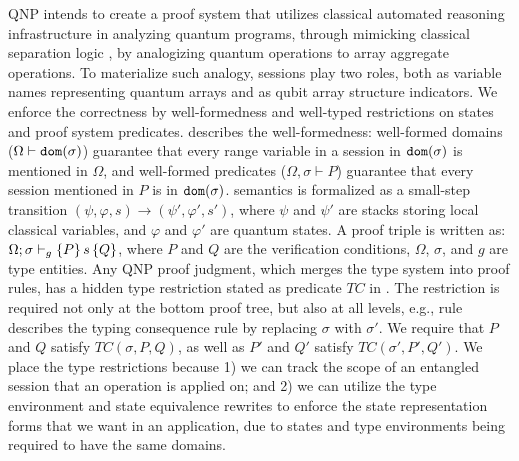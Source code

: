 QNP intends to create a proof system that utilizes classical automated reasoning infrastructure in analyzing quantum programs, through mimicking classical separation logic \cite{separationlogic}, by analogizing quantum operations to array aggregate operations.
To materialize such analogy, \qafny sessions play two roles, both as variable names representing quantum arrays and as qubit array structure indicators. We enforce the correctness by well-formedness and well-typed restrictions on states and proof system predicates.
 describes the well-formedness: well-formed domains ($\Omega\vdash \mathtt{dom}(\sigma)$) guarantee that every range variable in a session in $\mathtt{dom}(\sigma)$ is mentioned in $\Omega$, and well-formed predicates ($\Omega,\sigma \vdash P$) guarantee that every session mentioned in $P$ is in $\mathtt{dom}(\sigma)$.
\qafny semantics is formalized as a small-step transition $(\psi,\varphi,s) \longrightarrow (\psi',\varphi',s')$, where $\psi$ and $\psi'$ are stacks storing local classical variables, and $\varphi$ and $\varphi'$ are quantum states. A \qafny proof triple is written as: $\Omega;\sigma\vdash_{g}\{P\}\, s \,\{Q\}$, where $P$ and $Q$ are the verification conditions, $\Omega$, $\sigma$, and $g$ are type entities. Any QNP proof judgment, which merges the \qafny type system into proof rules, has a hidden type restriction stated as predicate $TC$ in .
The restriction is required not only at the bottom proof tree, but also at all levels, e.g., rule  describes the typing consequence rule by replacing $\sigma$ with $\sigma'$. We require that $P$ and $Q$ satisfy $TC(\sigma,P,Q)$, as well as $P'$ and $Q'$ satisfy $TC(\sigma',P',Q')$.
We place the type restrictions because 1) we can track the scope of an entangled session that an operation is applied on; and 2) we can utilize the type environment and state equivalence rewrites to enforce the state representation forms that we want in an application, due to states and type environments being required to have the same domains.

